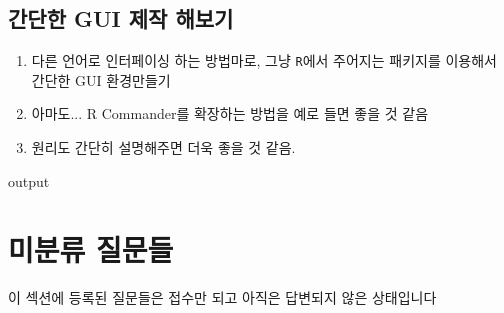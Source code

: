 \documentclass{book}
\begin{document}
\section{간단한 GUI 제작 해보기}

\begin{enumerate}
	\item 다른 언어로 인터페이싱 하는 방법마로, 그냥 \texttt{R}에서 주어지는 패키지를 이용해서 간단한 GUI 환경만들기
	\item 아마도... R Commander를 확장하는 방법을 예로 들면 좋을 것 같음
	\item 원리도 간단히 설명해주면 더욱 좋을 것 같음. 
\end{enumerate}

\begin{Schunk}
\begin{Soutput}
output
\end{Soutput}
\end{Schunk}

%
%
%


\chapter{미분류 질문들}


이 섹션에 등록된 질문들은 접수만 되고 아직은 답변되지 않은 상태입니다


\end{document}
